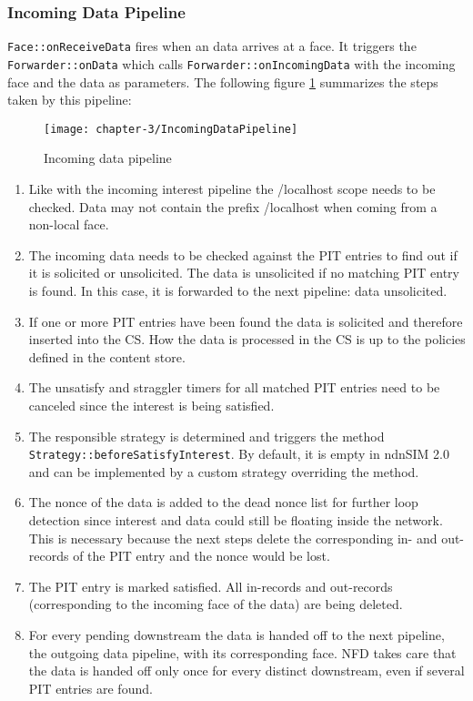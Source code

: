 \subsubsection{Incoming Data Pipeline}

 \texttt{Face::onReceiveData} fires when an data arrives at a face. It triggers the  \texttt{Forwarder::onData} which calls \texttt{Forwarder::onIncomingData} with the incoming face and the data as parameters.
The following figure \ref{fig:IncomingDataPipeline} summarizes the steps taken by this pipeline:

\begin{figure}[H]
  \centering
  \texttt{[image: chapter-3/IncomingDataPipeline]}
  \caption{Incoming data pipeline \cite{Afanasyev16}}
  \label{fig:IncomingDataPipeline}
\end{figure}

\begin{enumerate}
\item Like with the incoming interest pipeline the /localhost scope needs to be checked. Data may not contain the prefix /localhost when coming from a non-local face.
\item The incoming data needs to be checked against the PIT entries to find out if it is solicited or unsolicited. The data is unsolicited if no matching PIT entry is found. In this case, it is forwarded to the next pipeline: data unsolicited.
\item If one or more PIT entries have been found the data is solicited and therefore inserted into the CS. How the data is processed in the CS is up to the policies defined in the content store.
\item The unsatisfy and straggler timers for all matched PIT entries need to be canceled since the interest is being satisfied.
\item The responsible strategy is determined and triggers the method \texttt{Strategy::beforeSatisfyInterest}. By default, it is empty in ndnSIM 2.0 and can be implemented by a custom strategy overriding the method.
\item The nonce of the data is added to the dead nonce list for further loop detection since interest and data could still be floating inside the network. This is necessary because the next steps delete the corresponding in- and out-records of the PIT entry and the nonce would be lost. 
\item The PIT entry is marked satisfied. All in-records and out-records (corresponding to the incoming face of the data) are being deleted.
\item For every pending downstream the data is handed off to the next pipeline, the outgoing data pipeline, with its corresponding face. NFD takes care that the data is handed off only once for every distinct downstream, even if several PIT entries are found.
\end{enumerate}

